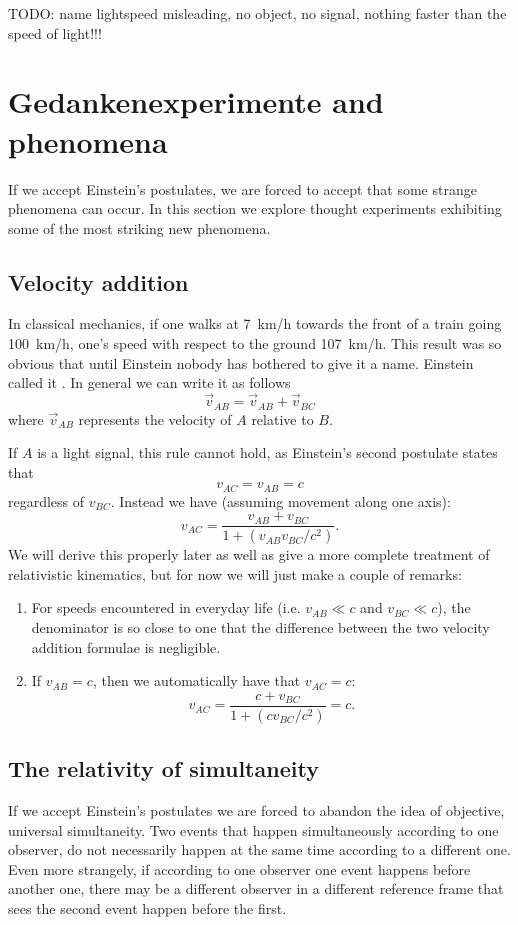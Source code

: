 TODO: name lightspeed misleading, no object, no signal, nothing faster than the speed of light!!!


\section{Gedankenexperimente and phenomena}
If we accept Einstein's postulates, we are forced to accept that some strange phenomena can occur. In this section we explore thought experiments exhibiting some of the most striking new phenomena.
\subsection{Velocity addition}
In classical mechanics, if one walks at \SI{7}{km/h} towards the front of a train going \SI{100}{km/h}, one's speed with respect to the ground \SI{107}{km/h}. This result was so obvious that until Einstein nobody has bothered to give it a name. Einstein called it . In general we can write it as follows 
\[ \vec{v}_{AB} = \vec{v}_{AB} + \vec{v}_{BC} \]
where $\vec{v}_{AB}$ represents the velocity of $A$ relative to $B$.

If $A$ is a light signal, this rule cannot hold, as Einstein's second postulate states that
\[ v_{AC} = v_{AB} = c \]
regardless of $v_{BC}$.
Instead we have  (assuming movement along one axis):
\[ v_{AC} = \frac{v_{AB}+v_{BC}}{1+(v_{AB}v_{BC}/c^2)}.\]
We will derive this properly later as well as give a more complete treatment of relativistic kinematics, but for now we will just make a couple of remarks:
\begin{enumerate}
\item For speeds encountered in everyday life (i.e. $v_{AB} \ll c$ and $v_{BC} \ll c$), the denominator is so close to one that the difference between the two velocity addition formulae is negligible.
\item If $v_{AB} = c$, then we automatically have that $v_{AC} = c$:
\[ v_{AC} = \frac{c+v_{BC}}{1+(cv_{BC}/c^2)} = c. \]
\end{enumerate}

\subsection{The relativity of simultaneity}
If we accept Einstein's postulates we are forced to abandon the idea of objective, universal simultaneity. Two events that happen simultaneously according to one observer, do not necessarily happen at the same time according to a different one. Even more strangely, if according to one observer one event happens before another one, there may be a different observer in a different reference frame that sees the second event happen before the first.


